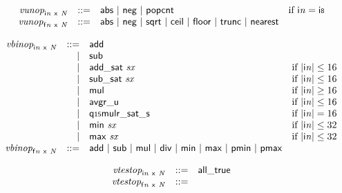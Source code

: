 $$
\begin{array}{@{}lrrl@{}l@{}}
& {{\mathit{vunop}}}_{{\mathsf{i}}{{\mathit{n}}}~\mathsf{x}~{\mathit{N}}} &::=& \mathsf{abs} ~|~ \mathsf{neg} ~|~ \mathsf{popcnt} &\quad
  \mbox{if}~{\mathsf{i}}{{\mathit{n}}} = \mathsf{i{\scriptstyle8}} \\
& {{\mathit{vunop}}}_{{\mathsf{f}}{{\mathit{n}}}~\mathsf{x}~{\mathit{N}}} &::=& \mathsf{abs} ~|~ \mathsf{neg} ~|~ \mathsf{sqrt} ~|~ \mathsf{ceil} ~|~ \mathsf{floor} ~|~ \mathsf{trunc} ~|~ \mathsf{nearest} \\
\end{array}
$$

$$
\begin{array}{@{}lrrl@{}l@{}}
& {{\mathit{vbinop}}}_{{\mathsf{i}}{{\mathit{n}}}~\mathsf{x}~{\mathit{N}}} &::=& \mathsf{add} \\ &&|&
\mathsf{sub} \\ &&|&
\mathsf{add\_sat}~{\mathit{sx}} &\quad
  \mbox{if}~{|{\mathsf{i}}{{\mathit{n}}}|} \leq 16 \\ &&|&
\mathsf{sub\_sat}~{\mathit{sx}} &\quad
  \mbox{if}~{|{\mathsf{i}}{{\mathit{n}}}|} \leq 16 \\ &&|&
\mathsf{mul} &\quad
  \mbox{if}~{|{\mathsf{i}}{{\mathit{n}}}|} \geq 16 \\ &&|&
\mathsf{avgr\_u} &\quad
  \mbox{if}~{|{\mathsf{i}}{{\mathit{n}}}|} \leq 16 \\ &&|&
\mathsf{q{\scriptstyle15}mulr\_sat\_s} &\quad
  \mbox{if}~{|{\mathsf{i}}{{\mathit{n}}}|} = 16 \\ &&|&
\mathsf{min}~{\mathit{sx}} &\quad
  \mbox{if}~{|{\mathsf{i}}{{\mathit{n}}}|} \leq 32 \\ &&|&
\mathsf{max}~{\mathit{sx}} &\quad
  \mbox{if}~{|{\mathsf{i}}{{\mathit{n}}}|} \leq 32 \\
& {{\mathit{vbinop}}}_{{\mathsf{f}}{{\mathit{n}}}~\mathsf{x}~{\mathit{N}}} &::=& \mathsf{add} ~|~ \mathsf{sub} ~|~ \mathsf{mul} ~|~ \mathsf{div} ~|~ \mathsf{min} ~|~ \mathsf{max} ~|~ \mathsf{pmin} ~|~ \mathsf{pmax} \\
\end{array}
$$

$$
\begin{array}{@{}lrrl@{}l@{}}
& {{\mathit{vtestop}}}_{{\mathsf{i}}{{\mathit{n}}}~\mathsf{x}~{\mathit{N}}} &::=& \mathsf{all\_true} \\
& {{\mathit{vtestop}}}_{{\mathsf{f}}{{\mathit{n}}}~\mathsf{x}~{\mathit{N}}} &::=&  \\
\end{array}
$$

